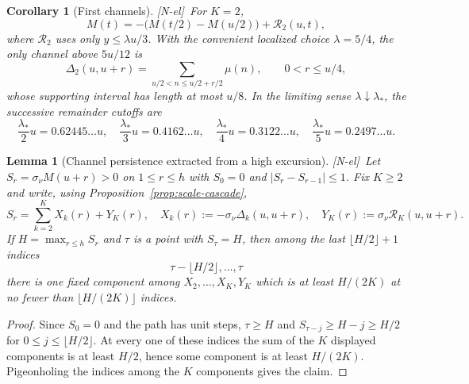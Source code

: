 \documentclass[11pt]{amsart}
\numberwithin{equation}{section}
\theoremstyle{plain}
\newtheorem{lemma}[theorem]{Lemma}
\newtheorem{corollary}[theorem]{Corollary}
\theoremstyle{definition}
\theoremstyle{remark}
\newcommand{\tagNE}{\textup{[N-el]}}
\begin{document}
\begin{corollary}[First channels]
\label{cor:first-channels}
\tagNE\ For $K=2$,
\[
M(t)=-\bigl(M(t/2)-M(u/2)\bigr)+\mathcal R_2(u,t),
\]
where $\mathcal R_2$ uses only $y\le\lambda u/3$.  With the convenient localized
choice $\lambda=5/4$, the only channel above $5u/12$ is
\[
\Delta_2(u,u+r)=\sum_{u/2<n\le u/2+r/2}\mu(n),
\qquad 0<r\le u/4,
\]
whose supporting interval has length at most $u/8$.  In the limiting
sense $\lambda\downarrow\lambda_*$, the successive remainder cutoffs are
\[
\frac{\lambda_*}{2}u=0.62445\ldots u,\quad
\frac{\lambda_*}{3}u=0.4162\ldots u,\quad
\frac{\lambda_*}{4}u=0.3122\ldots u,\quad
\frac{\lambda_*}{5}u=0.2497\ldots u.
\]
\end{corollary}

\begin{lemma}[Channel persistence extracted from a high excursion]
\label{lem:channel-persistence}
\tagNE\ Let $S_r=\sigma_\nu M(u+r)>0$ on $1\le r\le h$ with $S_0=0$ and
$|S_r-S_{r-1}|\le1$.  Fix $K\ge2$ and write, using
Proposition~\ref{prop:scale-cascade},
\[
S_r=\sum_{k=2}^{K}X_k(r)+Y_K(r),
\quad
X_k(r):=-\sigma_\nu\Delta_k(u,u+r),
\quad
Y_K(r):=\sigma_\nu \mathcal R_K(u,u+r).
\]
If $H=\max_{r\le h}S_r$ and $\tau$ is a point with $S_\tau=H$, then among
the last $\lfloor H/2\rfloor+1$ indices
\[
\tau-\lfloor H/2\rfloor,\ldots,\tau
\]
there is one fixed component among
$X_2,\ldots,X_K,Y_K$ which is at least $H/(2K)$ at no fewer than
$\lfloor H/(2K)\rfloor$ indices.
\end{lemma}

\begin{proof}
Since $S_0=0$ and the path has unit steps, $\tau\ge H$ and
$S_{\tau-j}\ge H-j\ge H/2$ for
$0\le j\le\lfloor H/2\rfloor$.  At every one of these indices the sum of
the $K$ displayed components is at least $H/2$, hence some component is at
least $H/(2K)$.  Pigeonholing the indices among the $K$ components gives the
claim.
\end{proof}
\end{document}
